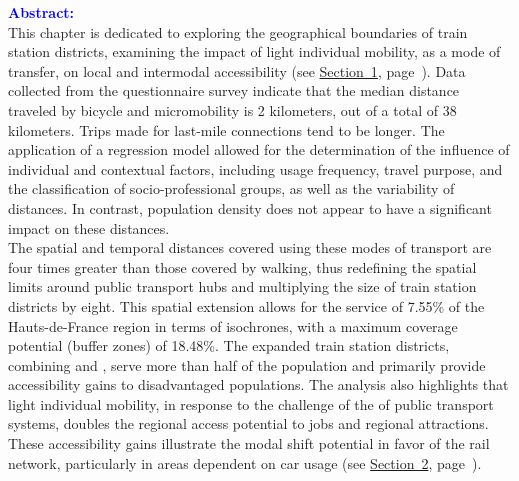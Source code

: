 \begin{refsegment}
\newpage
\begin{tcolorbox}[colback=white!5!white,
                  colframe=blue!75!blue,
                  title=
                  \bigskip
                  \center{\textbf{Preambule of Chapter~5}}
                  \\
                  \raggedright{\small{Chapter composed of \pagedifference{chap5:titre}{part2:conclusion} pages, including \pagedifference{chap5:bibliographie}{part2:conclusion} pages of bibliography}}
                  \bigskip]
\Large{\textcolor{blue}{\textbf{Abstract:}}}
    \\
    \small{
This chapter is dedicated to exploring the geographical boundaries of train station districts, examining the impact of light individual mobility, as a mode of transfer, on local and intermodal accessibility (see \hyperref[chap5:aire-cyclable-micromobilite]{Section~1}, page~\pageref{chap5:aire-cyclable-micromobilite}). Data collected from the questionnaire survey indicate that the median distance traveled by bicycle and micromobility is 2 kilometers, out of a total of 38 kilometers. Trips made for last-mile connections tend to be longer. The application of a regression model allowed for the determination of the influence of individual and contextual factors, including usage frequency, travel purpose, and the classification of socio-professional groups, as well as the variability of distances. In contrast, population density does not appear to have a significant impact on these distances.%
    \\
The spatial and temporal distances covered using these modes of transport are four times greater than those covered by walking, thus redefining the spatial limits around public transport hubs and multiplying the size of train station districts by eight. This spatial extension allows for the service of 7.55\% of the Hauts-de-France region in terms of isochrones, with a maximum coverage potential (buffer zones) of 18.48\%. The expanded train station districts, combining  and , serve more than half of the population and primarily provide accessibility gains to disadvantaged populations. The analysis also highlights that light individual mobility, in response to the challenge of the  of public transport systems, doubles the regional access potential to jobs and regional attractions. These accessibility gains illustrate the modal shift potential in favor of the rail network, particularly in areas dependent on car usage (see \hyperref[chap5:accessibilite-intermodale-extension-aire-influence]{Section~2}, page~\pageref{chap5:accessibilite-intermodale-extension-aire-influence}).%
}
\end{tcolorbox}
\end{refsegment}
